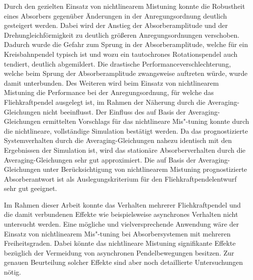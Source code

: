 Durch den gezielten Einsatz von nichtlinearem Mistuning konnte die Robustheit
eines Absorbers  gegenüber Änderungen in der Anregungsordnung deutlich gesteigert werden.
Dabei wird der Anstieg der Absorberamplitude und der  Drehungleichförmigkeit 
zu deutlich größeren Anregungsordnungen verschoben.
Dadurch wurde die Gefahr zum Sprung in der Absorberamplitude, welche für
ein Kreisbahnpendel typisch ist und wozu ein tautochrones Rotationspendel 
auch tendiert, deutlich abgemildert. 
Die drastische Performanceverschlechterung, welche beim Sprung
der Absorberamplitude zwangsweise auftreten würde, wurde damit unterbunden.
Des Weiteren wird beim Einsatz von nichtlinearem Mistuning die Performance 
bei der Anregungsordnung, für welche das Fliehkraftpendel ausgelegt ist,
im Rahmen der Näherung durch die Averaging-Gleichungen nicht beeinflusst.
Der Einfluss des auf Basis der Averaging-Gleichungen ermittelten Vorschlags für das
nichtlineare Mis"-tuning konnte durch die nichtlineare, vollständige Simulation bestätigt werden. 
Da das prognostizierte Systemverhalten durch die Averaging-Gleichungen 
nahezu identisch mit  den Ergebnissen der Simulation ist,
wird das stationäre Absorberverhalten durch die Averaging-Gleichungen sehr gut approximiert.
Die auf Basis der Averaging-Gleichungen unter Berücksichtigung von 
nichtlinearem Mistuning prognostizierte Absorberantwort ist als Auslegungskriterium für den Fliehkraftpendelentwurf
sehr gut geeignet.


Im Rahmen dieser Arbeit konnte das Verhalten mehrerer Fliehkraftpendel
und die damit verbundenen Effekte wie beispielsweise asynchrones Verhalten
nicht untersucht werden. 
Eine mögliche und vielversprechende Anwendung wäre der Einsatz von 
nichtlinearem Mis"-tuning bei Absorbersystemen mit mehreren Freiheitsgraden.
Dabei könnte das nichtlineare Mistuning signifikante Effekte bezüglich
der Vermeidung von asynchronen Pendelbewegungen besitzen.
Zur genauen  Beurteilung solcher Effekte sind aber noch detaillierte Untersuchungen nötig.



